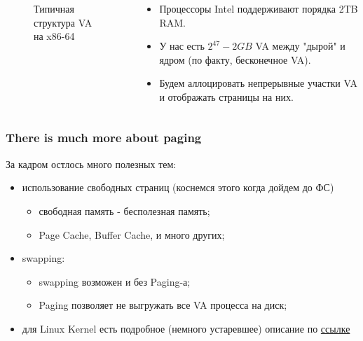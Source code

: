 \begin{frame}
\begin{columns}[T]
\begin{column}{.4\textwidth}
\begin{figure}
      \caption{Типичная структура VA на x86-64}
    \end{figure}
  \end{column}
  \begin{column}{.5\textwidth}
    \begin{itemize}
      \item Процессоры Intel поддерживают порядка 2TB RAM.
      \item У нас есть $2^{47} - 2GB$ VA между "дырой" и ядром (по факту, бесконечное VA).
      \item Будем аллоцировать непрерывные участки VA и отображать страницы на них.
    \end{itemize}
  \end{column}
\end{columns}
\end{frame}

\begin{frame}
\frametitle{There is much more about paging}

За кадром остлось много полезных тем:
\begin{itemize}
  \item<2-> использование свободных страниц (коснемся этого когда дойдем до ФС)
    \begin{itemize}
      \item свободная память - бесполезная память;
      \item Page Cache, Buffer Cache, и много других;
    \end{itemize}
  \item<3-> swapping:
    \begin{itemize}
      \item swapping возможен и без Paging-а;
      \item Paging позволяет не выгружать все VA процесса на диск;
    \end{itemize}
  \item<4-> для Linux Kernel есть подробное (немного устаревшее) описание по \href{https://www.kernel.org/doc/gorman/}{ссылке}
\end{itemize}

\end{frame}
